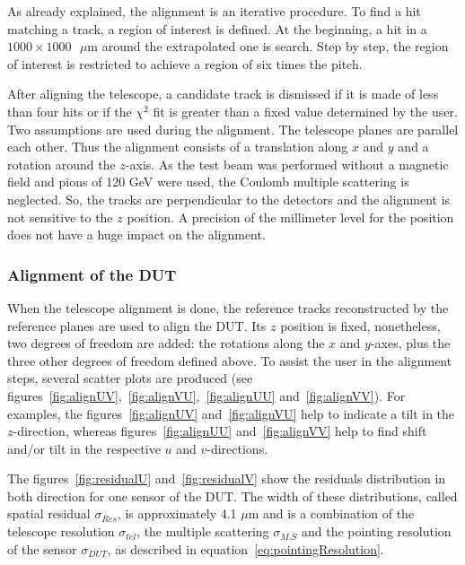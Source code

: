       As already explained, the alignment is an iterative procedure.
      To find a hit matching a track, a region of interest is defined.
      At the beginning, a hit in a $1000 \times 1000 \text{ }\mu\text{m}$ around the extrapolated one is search.
      Step by step, the region of interest is restricted to achieve a region of six times the pitch.
      
      After aligning the telescope, a candidate track is dismissed if it is made of less than four hits or if the $\chi^2$ fit is greater than a fixed value determined by the user. 
      Two assumptions are used during the alignment. 
      The telescope planes are parallel each other.
      Thus the alignment consists of a translation along $x$ and $y$ and a rotation around the $z$-axis.
      As the test beam was performed without a magnetic field and pions of 120 GeV were used, the Coulomb multiple scattering is neglected.
      So, the tracks are perpendicular to the detectors and the alignment is not sensitive to the $z$ position.
      A precision of the millimeter level for the position does not have a huge impact on the alignment.

      \subsubsection{Alignment of the DUT}

      When the telescope alignment is done, the reference tracks reconstructed by the reference planes are used to align the \gls{DUT}.
      Its $z$ position is fixed, nonetheless, two degrees of freedom are added: the rotations along the $x$ and $y$-axes, plus the three other degrees of freedom defined above.
      To assist the user in the alignment steps, several scatter plots are produced (see figures~\ref{fig:alignUV},~\ref{fig:alignVU},~\ref{fig:alignUU} and~\ref{fig:alignVV}).
      For examples, the figures~\ref{fig:alignUV} and~\ref{fig:alignVU} help to indicate a tilt in the $z$-direction, whereas figures~\ref{fig:alignUU} and~\ref{fig:alignVV} help to find shift and/or tilt in the respective $u$ and $v$-directions.

      The figures~\ref{fig:residualU} and~\ref{fig:residualV} show the residuals distribution in both direction for one sensor of the \gls{DUT}.
      The width of these distributions, called spatial residual $\sigma_{Res}$, is approximately 4.1 $\mu\text{m}$ and is a combination of the telescope resolution $\sigma_{tel}$, the multiple scattering $\sigma_{M.S}$ and the pointing resolution of the sensor $\sigma_{DUT}$, as described in equation~\ref{eq:pointingResolution}.
      
